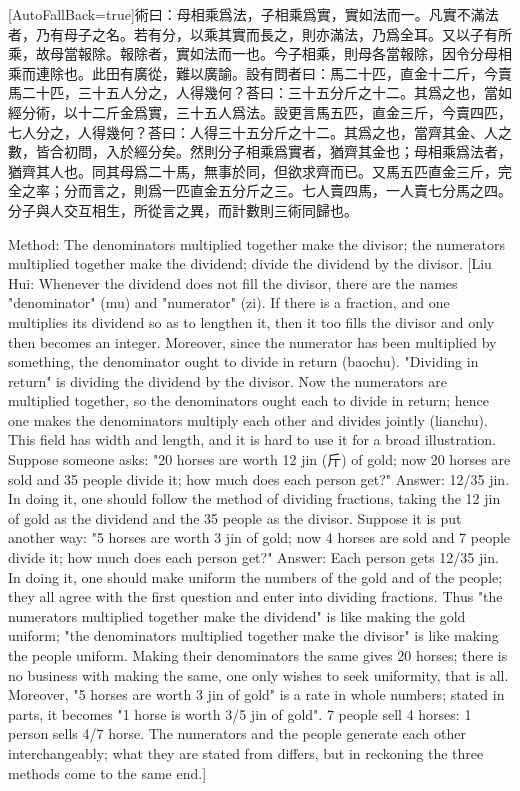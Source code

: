 \documentclass[11pt]{article}
\newcommand{\zhsmall}{\footnotesize\color{black!70}}
\newcommand{\unitlabel}[1]{\marginpar{\raggedleft\tiny\color{gray}#1}}
\newenvironment{unitzh}{\par\CJKfontspec{Noto Serif CJK SC}[AutoFallBack=true]\large\linespread{1.25}\selectfont}{\par}
\newenvironment{uniten}{\par\small\color{black!85}}{\par\medskip}
\begin{document}
\begin{unitzh}\unitlabel{jiuzhang-004.13}術曰：母相乘爲法，子相乘爲實，實如法而一。{\zhsmall 凡實不滿法者，乃有母子之名。若有分，以乘其實而長之，則亦滿法，乃爲全耳。又以子有所乘，故母當報除。報除者，實如法而一也。今子相乘，則母各當報除，因令分母相乘而連除也。此田有廣從，難以廣諭。設有問者曰：馬二十匹，直金十二斤，今賣馬二十匹，三十五人分之，人得幾何？荅曰：三十五分斤之十二。其爲之也，當如經分術，以十二斤金爲實，三十五人爲法。設更言馬五匹，直金三斤，今賣四匹，七人分之，人得幾何？荅曰：人得三十五分斤之十二。其爲之也，當齊其金、人之數，皆合初問，入於經分矣。然則分子相乘爲實者，猶齊其金也；母相乘爲法者，猶齊其人也。同其母爲二十馬，無事於同，但欲求齊而已。又馬五匹直金三斤，完全之率；分而言之，則爲一匹直金五分斤之三。七人賣四馬，一人賣七分馬之四。分子與人交互相生，所從言之異，而計數則三術同歸也。}\end{unitzh}
\begin{uniten}Method: The denominators multiplied together make the divisor; the numerators multiplied together make the dividend; divide the dividend by the divisor. [Liu Hui: Whenever the dividend does not fill the divisor, there are the names "denominator" (mu) and "numerator" (zi). If there is a fraction, and one multiplies its dividend so as to lengthen it, then it too fills the divisor and only then becomes an integer. Moreover, since the numerator has been multiplied by something, the denominator ought to divide in return (baochu). "Dividing in return" is dividing the dividend by the divisor. Now the numerators are multiplied together, so the denominators ought each to divide in return; hence one makes the denominators multiply each other and divides jointly (lianchu). This field has width and length, and it is hard to use it for a broad illustration. Suppose someone asks: "20 horses are worth 12 jin (斤) of gold; now 20 horses are sold and 35 people divide it; how much does each person get?" Answer: 12/35 jin. In doing it, one should follow the method of dividing fractions, taking the 12 jin of gold as the dividend and the 35 people as the divisor. Suppose it is put another way: "5 horses are worth 3 jin of gold; now 4 horses are sold and 7 people divide it; how much does each person get?" Answer: Each person gets 12/35 jin. In doing it, one should make uniform the numbers of the gold and of the people; they all agree with the first question and enter into dividing fractions. Thus "the numerators multiplied together make the dividend" is like making the gold uniform; "the denominators multiplied together make the divisor" is like making the people uniform. Making their denominators the same gives 20 horses; there is no business with making the same, one only wishes to seek uniformity, that is all. Moreover, "5 horses are worth 3 jin of gold" is a rate in whole numbers; stated in parts, it becomes "1 horse is worth 3/5 jin of gold". 7 people sell 4 horses: 1 person sells 4/7 horse. The numerators and the people generate each other interchangeably; what they are stated from differs, but in reckoning the three methods come to the same end.]\end{uniten}
\end{document}
